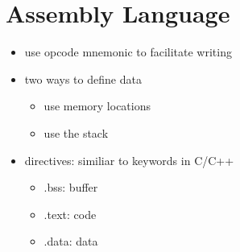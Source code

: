 \section{Assembly Language}
\begin{itemize}
    \item use opcode mnemonic to facilitate writing
    \item two ways to define data
        \begin{itemize}
            \item use memory locations
            \item use the stack
        \end{itemize}
    \item directives: similiar to keywords in C/C++
        \begin{itemize}
            \item .bss: buffer
            \item .text: code
            \item .data: data
        \end{itemize}
\end{itemize}
